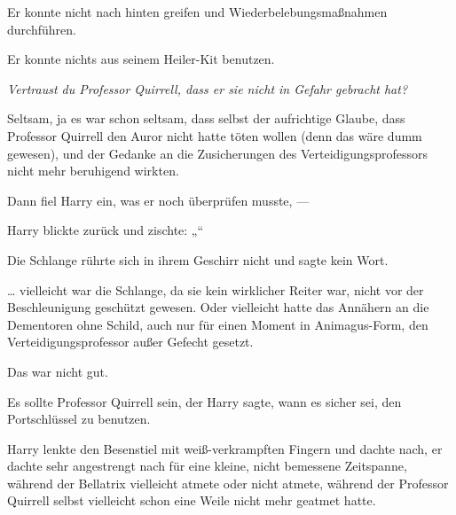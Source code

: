 Er konnte nicht nach hinten greifen und Wiederbelebungsmaßnahmen durchführen.

Er konnte nichts aus seinem Heiler-Kit benutzen.

\emph{Vertraust du Professor Quirrell, dass er sie nicht in Gefahr gebracht hat?}

Seltsam, ja es war schon seltsam, dass selbst der aufrichtige Glaube, dass Professor Quirrell den Auror nicht hatte töten wollen (denn das wäre dumm gewesen), und der Gedanke an die Zusicherungen des Verteidigungsprofessors nicht mehr beruhigend wirkten.

Dann fiel Harry ein, was er noch überprüfen musste, —

Harry blickte zurück und zischte: „“

Die Schlange rührte sich in ihrem Geschirr nicht und sagte kein Wort.

… vielleicht war die Schlange, da sie kein wirklicher Reiter war, nicht vor der Beschleunigung geschützt gewesen. Oder vielleicht hatte das Annähern an die Dementoren ohne Schild, auch nur für einen Moment in Animagus-Form, den Verteidigungsprofessor außer Gefecht gesetzt.

Das war nicht gut.

Es sollte Professor Quirrell sein, der Harry sagte, wann es sicher sei, den Portschlüssel zu benutzen.

Harry lenkte den Besenstiel mit weiß-verkrampften Fingern und dachte nach, er dachte sehr angestrengt nach für eine kleine, nicht bemessene Zeitspanne, während der Bellatrix vielleicht atmete oder nicht atmete, während der Professor Quirrell selbst vielleicht schon eine Weile nicht mehr geatmet hatte.

